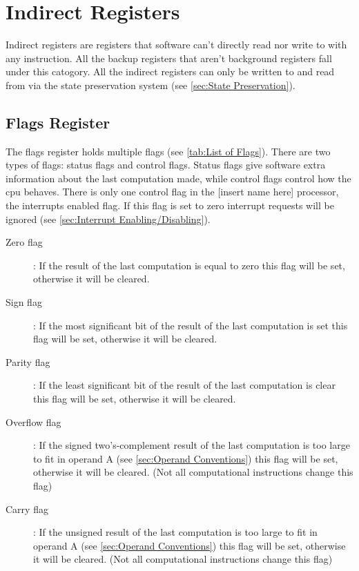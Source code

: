 \documentclass[oneside, a4paper]{memoir}
\begin{document}
\section{Indirect Registers}
Indirect registers are registers that software can't directly read nor write to with any instruction. All the backup registers that aren't background registers fall under this catogory. All the indirect registers can only be written to and read from via the state preservation system (see \autoref{sec:State Preservation}).
\subsection{Flags Register}
\label{sub:Flags Register}
The flags register holds multiple flags (see \autoref{tab:List of Flags}). There are two types of flags: status flags and control flags. Status flags give software extra information about the last computation made, while control flags control how the cpu behaves. There is only one control flag in the [insert name here] processor, the interrupts enabled flag. If this flag is set to zero interrupt requests will be ignored (see \autoref{sec:Interrupt Enabling/Disabling}).
\begin{description}
\item[Zero flag]: If the result of the last computation is equal to zero this flag will be set, otherwise it will be cleared.
\item[Sign flag]: If the most significant  bit of the result of the last computation is set this flag will be set, otherwise it will be cleared.
\item[Parity flag]: If the least significant  bit of the result of the last computation is clear this flag will be set, otherwise it will be cleared.
\item[Overflow flag]: If the signed two's-complement result of the last computation is too large to fit in operand A (see \autoref{sec:Operand Conventions}) this flag will be set, otherwise it will be cleared. (Not all computational instructions change this flag)
\item[Carry flag]: If the unsigned result of the last computation is too large to fit in operand A (see \autoref{sec:Operand Conventions}) this flag will be set, otherwise it will be cleared. (Not all computational instructions change this flag)
\end{description}
\end{document}
